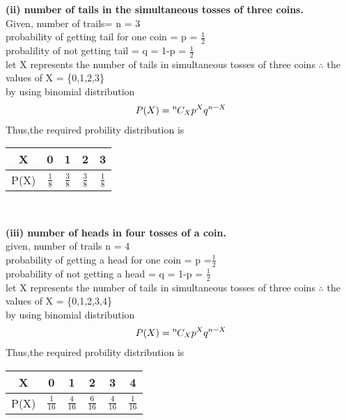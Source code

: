 \documentclass[10pt, a4paper]{article}
\newcommand*{\permcomb}[4][0mu]{{{}^{#3}\mkern#1#2_{#4}}}
\newcommand*{\comb}[1][-1mu]{\permcomb[#1]{C}}
\begin{document}
\textbf{(ii) number of tails in the simultaneous tosses of three coins.}\\
Given, number of trails= n = 3\\
probability of getting tail for one coin = p = $\frac{1}{2}$\\
probalility of not getting tail =  q = 1-p = $\frac{1}{2}$\\
let X represents the number of tails in simultaneous tosses of three coins
 $\therefore$ the values of X = \{0,1,2,3\}\\
 by using binomial distribution\\
 \begin{align*}
 P(X) = \comb{n}{X}p^Xq^{n-X}
 \end{align*}
Thus,the required probility distribution is\\
\begin{center}
\begin{tabular}{ |c|c|c|c|c| }
\hline
X & 0 & 1 & 2 & 3\\
\hline
P(X) & $\frac{1}{8}$ & $\frac{3}{8}$ & $\frac{3}{8}$ & $\frac{1}{8}$\\
\hline
\end{tabular}\\
\end{center}
\textbf{(iii) number of heads in four tosses of a coin.}\\
given, number of trails n = 4\\
probability of getting a head for one coin = p =$\frac{1}{2}$\\
probability of not getting a head = q = 1-p = $\frac{1}{2}$\\
let X represents the number of tails in simultaneous tosses of three coins
 $\therefore$ the values of X = \{0,1,2,3,4\}\\
 by using binomial distribution\\
 \begin{align*}
 P(X) = \comb{n}{X}p^Xq^{n-X}
 \end{align*}
Thus,the required probility distribution is\\
\begin{center}
\begin{tabular}{ |c|c|c|c|c|c| }
\hline
X & 0 & 1 & 2 & 3 & 4\\
\hline
P(X) & $\frac{1}{16}$ & $\frac{4}{16}$ & $\frac{6}{16}$ & $\frac{4}{16}$ & $\frac{1}{16}$\\
\hline
\end{tabular}\\
\end{center}
\end{document}
